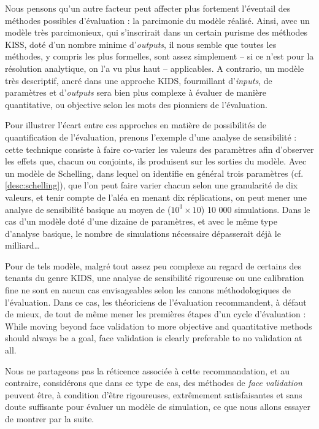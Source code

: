 Nous pensons qu'un autre facteur peut affecter plus fortement l'éventail des méthodes possibles d'évaluation : la parcimonie du modèle réalisé.
Ainsi, avec un modèle très parcimonieux, qui s'inscrirait dans un certain purisme des méthodes \og KISS\fg{}, doté d'un nombre minime d'\textit{outputs}, il nous semble que toutes les méthodes, y compris les plus formelles, sont assez simplement -- si ce n'est pour la résolution analytique, on l'a vu plus haut -- applicables.
A contrario, un modèle très descriptif, ancré dans une approche \og KIDS\fg{}, fourmillant d'\textit{inputs}, de paramètres et d'\textit{outputs} sera bien plus complexe à évaluer de manière quantitative, ou \og objective\fg{} selon les mots des pionniers de l'évaluation.

Pour illustrer l'écart entre ces approches en matière de possibilités de quantification de l'évaluation, prenons l'exemple d'une analyse de sensibilité :
	cette technique consiste à faire co-varier les valeurs des paramètres afin d'observer les effets que, chacun ou conjoints, ils produisent sur les sorties du modèle.
Avec un modèle de Schelling, dans lequel on identifie en général trois paramètres (cf. \cref{desc:schelling}), que l'on peut faire varier chacun selon une granularité de dix valeurs, et tenir compte de l'aléa en menant dix réplications, on peut mener une analyse de sensibilité basique au moyen de ($10^3 \times 10$) 10 000 simulations.
Dans le cas d'un modèle doté d'une dizaine de paramètres, et avec le même type d'analyse basique, le nombre de simulations nécessaire dépasserait déjà le milliard\ldots

Pour de tels modèle, malgré tout assez peu complexe au regard de certains des tenants du genre KIDS, une analyse de sensibilité rigoureuse ou une calibration fine ne sont en aucun cas envisageables selon les canons méthodologiques de l'évaluation.
Dans ce cas, les théoriciens de l'évaluation recommandent, à défaut de mieux, de tout de même mener les premières étapes d'un cycle d'évaluation \autocite[342]{petty2010verification} :
	\og While moving beyond face validation to more objective and quantitative methods should always be a goal, face validation is clearly preferable to no validation at all.\fg{}

Nous ne partageons pas la réticence associée à cette recommandation, et au contraire, considérons que dans ce type de cas, des méthodes de \og \textit{face validation}\fg{} peuvent être, à condition d'être rigoureuses, extrêmement satisfaisantes et sans doute suffisante pour évaluer un modèle de simulation, ce que nous allons essayer de montrer par la suite.

